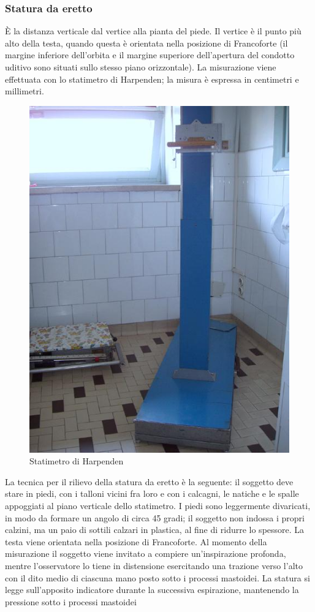 \subsubsection*{Statura da eretto}
\`E la distanza verticale dal vertice alla pianta del piede. Il vertice è il punto più alto della testa, quando questa è orientata nella posizione di Francoforte (il margine inferiore dell'orbita e il margine superiore dell'apertura del condotto uditivo sono situati sullo stesso piano orizzontale). La misurazione viene effettuata con lo statimetro di Harpenden; la misura è espressa in centimetri e millimetri.
\begin{figure}[h]
  \begin{center}
	\includegraphics[scale=0.40]{grafici/statimetro.jpg}
  \end{center}
  \caption{Statimetro di Harpenden}
\end{figure}
La tecnica per il rilievo della statura da eretto è la seguente: il soggetto deve stare in piedi, con i talloni vicini fra loro e con i calcagni, le natiche e le spalle appoggiati al piano verticale dello statimetro. I piedi sono leggermente divaricati, in modo da formare un angolo di circa 45 gradi; il soggetto non indossa i propri calzini, ma un paio di sottili calzari in plastica, al fine di ridurre lo spessore. La testa viene orientata nella posizione di Francoforte. Al momento della misurazione il soggetto viene invitato a compiere un'inspirazione profonda, mentre l'osservatore lo tiene in distensione esercitando una trazione verso l'alto con il dito medio di ciascuna mano posto sotto i processi mastoidei. La statura si legge sull'apposito indicatore durante la successiva espirazione, mantenendo la pressione sotto i processi mastoidei%

